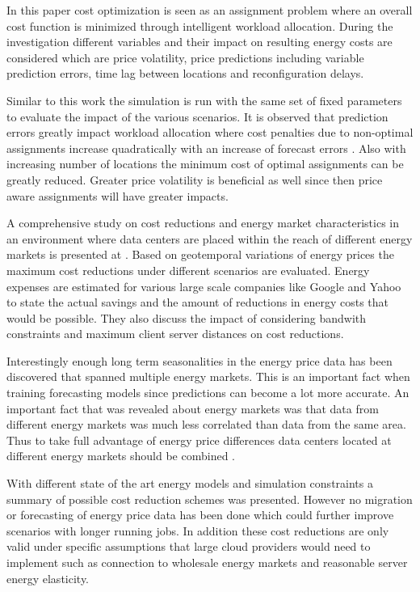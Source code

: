 In this paper cost optimization is seen as an assignment problem where an overall cost function is minimized through intelligent workload allocation. During the investigation different variables and their impact on resulting energy costs are considered which are price volatility, price predictions including variable prediction errors, time lag between locations and reconfiguration delays. 

Similar to this work the simulation is run with the same set of fixed parameters to evaluate the impact of the various scenarios. It is observed that prediction errors greatly impact workload allocation where cost penalties due to non-optimal assignments increase quadratically with an increase of forecast errors \cite{de2013study}. Also with increasing number of locations the minimum cost of optimal assignments can be greatly reduced. Greater price volatility is beneficial as well since then price aware assignments will have greater impacts. 

A comprehensive study on cost reductions and energy market characteristics in an environment where data centers are placed within the reach of different energy markets is presented at \cite{qureshi2009cutting}. Based on geotemporal variations of energy prices the maximum cost reductions under different scenarios are evaluated. Energy expenses are estimated for various large scale companies like Google and Yahoo to state the actual savings and the amount of reductions in energy costs that would be possible. 
They also discuss the impact of considering bandwith constraints and maximum client server distances on cost reductions. 

Interestingly enough long term seasonalities in the energy price data has been discovered that spanned multiple energy markets. This is an important fact when training forecasting models since predictions can become a lot more accurate. An important fact that was revealed about energy markets was that data from different energy markets was much less correlated than data from the same area. Thus to take full advantage of energy price differences data centers located at different energy markets should be combined \cite{qureshi2009cutting}. 

With different state of the art energy models and simulation constraints a summary of possible cost reduction schemes was presented. However no migration or forecasting of energy price data has been done which could further improve scenarios with longer running jobs. In addition these cost reductions are only valid under specific assumptions that large cloud providers would need to implement such as connection to wholesale energy markets and reasonable server energy elasticity. 



